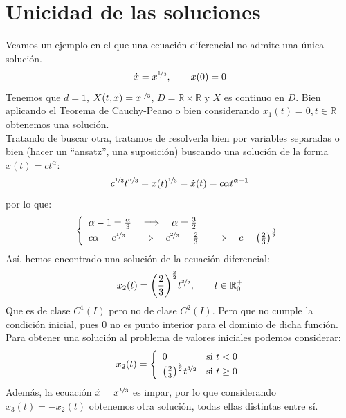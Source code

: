 \section{Unicidad de las soluciones}
\begin{ejemplo}
    Veamos un ejemplo en el que una ecuación diferencial no admite una única solución.\\
    \begin{equation*}
        \dot{x} = x^{\nicefrac{1}{3}}, \qquad x(0) = 0
    \end{equation*}
    Tenemos que $d=1$, $X(t,x) = x^{\nicefrac{1}{3}}$, $D = \mathbb{R}\times \mathbb{R}$ y $X$ es continuo en $D$. Bien aplicando el Teorema de Cauchy-Peano o bien considerando $x_1(t)= 0, t\in \mathbb{R}$ obtenemos una solución.\\

    \noindent %
    Tratando de buscar otra, tratamos de resolverla bien por variables separadas o bien (hacer un ``ansatz'', una suposición) buscando una solución de la forma $x(t) = ct^\alpha$:
    \begin{equation*}
        c^{\nicefrac{1}{3}}t^{\nicefrac{\alpha}{3}} = x(t)^{\nicefrac{1}{3}} = \dot{x}(t) = c\alpha t^{\alpha-1}
    \end{equation*}
    por lo que:
    \begin{equation*}
        \left\{\begin{array}{l}
            \alpha-1 = \frac{\alpha}{3} \quad\Longrightarrow\quad\alpha = \frac{3}{2} \\
            c\alpha = c^{\nicefrac{1}{3}} \quad\Longrightarrow\quad c^{\nicefrac{2}{3}} = \frac{2}{3} \quad\Longrightarrow\quad c = {\left(\frac{2}{3}\right)}^{\frac{3}{2}}
        \end{array}\right.
    \end{equation*}
    Así, hemos encontrado una solución de la ecuación diferencial:
    \begin{equation*}
        x_2(t) = {\left(\frac{2}{3}\right)}^{\frac{3}{2}} t^{\nicefrac{3}{2}}, \qquad t\in \mathbb{R}^+_0
    \end{equation*}
    Que es de clase $C^1(I)$ pero no de clase $C^2(I)$. Pero que no cumple la condición inicial, pues $0$ no es punto interior para el dominio de dicha función.\\

    \noindent
    Para obtener una solución al problema de valores iniciales podemos considerar:
    \begin{equation*}
        x_2(t) = \left\{\begin{array}{ll}
            0 & \text{si\ } t<0 \\
             {\left(\frac{2}{3}\right)}^{\frac{3}{2}} t^{\nicefrac{3}{2}}& \text{si\ } t\geq 0
        \end{array}\right. 
    \end{equation*}
    Además, la ecuación $\dot{x}= x^{\nicefrac{1}{3}}$ es impar, por lo que considerando $x_3(t) = -x_2(t)$ obtenemos otra solución, todas ellas distintas entre sí.\\


\end{ejemplo}
